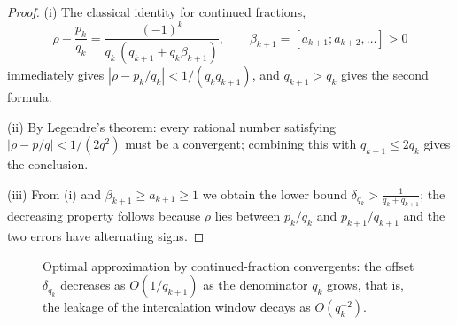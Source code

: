\begin{proof}
(i) The classical identity for continued fractions,
\[
\rho-\frac{p_k}{q_k}=\frac{(-1)^k}{q_k\,(q_{k+1}+q_k\beta_{k+1})},\qquad \beta_{k+1}=[a_{k+1};a_{k+2},\dots]>0
\]
immediately gives $|\rho-p_k/q_k|<1/(q_kq_{k+1})$, and $q_{k+1}>q_k$ gives the second formula.

(ii) By Legendre's theorem: every rational number satisfying $|\rho-p/q|<1/(2q^2)$ must be a convergent; combining this with $q_{k+1}\le2q_k$ gives the conclusion.

(iii) From (i) and $\beta_{k+1}\ge a_{k+1}\ge1$ we obtain the lower bound $\delta_{q_k}>\frac{1}{q_k+q_{k+1}}$; the decreasing property follows because $\rho$ lies between $p_k/q_k$ and $p_{k+1}/q_{k+1}$ and the two errors have alternating signs.
\end{proof}

\begin{figure}[htbp]
\centering
{}
\caption{Optimal approximation by continued-fraction convergents: the offset $\delta_{q_k}$ decreases as $O(1/q_{k+1})$ as the denominator $q_k$ grows, that is, the leakage of the intercalation window decays as $O(q_k^{-2})$.}
\label{fig:continued_fraction_convergence}
\end{figure}

